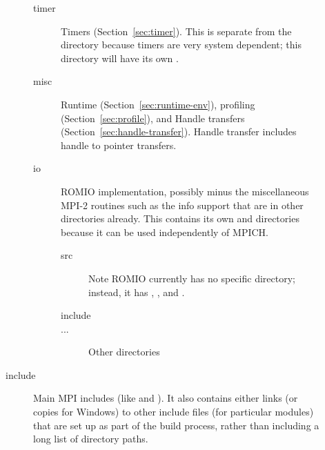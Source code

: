 \documentclass{article}
\begin{document}
\begin{description}
\begin{description}
\begin{description}
    \item[timer]Timers (Section~\ref{sec:timer}).  This is separate from the
       directory because timers are very system dependent; this
      directory will have its own .
    \item[misc]Runtime (Section~\ref{sec:runtime-env}), profiling
      (Section~\ref{sec:profile}), and Handle transfers
      (Section~\ref{sec:handle-transfer}).  Handle transfer includes handle to
      pointer transfers. 
    \item[io]ROMIO implementation, possibly minus the miscellaneous MPI-2
      routines such as the info support that are in other directories already.
      This contains its own  and  directories
      because it can be used independently of MPICH.
      \begin{description}
      \item[src]Note ROMIO currently has no specific  directory;
        instead, it has , , and .
      \item[include]
      \item[...]Other directories
      \end{description}
    \end{description}
\item[include]Main MPI includes (like  and ).  
  It also contains either links (or copies for Windows) to 
  other include files (for particular modules) that are set up as part of
  the build process, rather than including a long list of directory paths.

\end{description}
\end{description}
\end{document}
